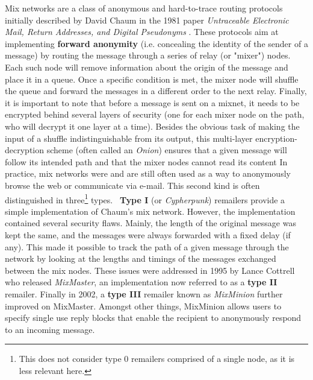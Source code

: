 \documentclass[11pt, a4paper]{article}
\begin{document}
        Mix networks are a class of anonymous and hard-to-trace routing protocols initially described by David Chaum in the 1981 paper \textit{Untraceable Electronic Mail, Return Addresses, and Digital Pseudonyms} \cite{chaum84}.
        These protocols aim at implementing \textbf{forward anonymity} (i.e. concealing the identity of the sender of a message) by routing the message through a series of relay (or "mixer") nodes.
        Each such node will remove information about the origin of the message and place it in a queue.
        Once a specific condition is met, the mixer node will shuffle the queue and forward the messages in a different order to the next relay.
        Finally, it is important to note that before a message is sent on a mixnet, it needs to be encrypted behind several layers of security (one for each mixer node on the path, who will decrypt it one layer at a time).
        Besides the obvious task of making the input of a shuffle indistinguishable from its output, this multi-layer encryption-decryption scheme (often called an \textit{Onion}) ensures that a given message will follow its intended path and that the mixer nodes cannot read its content
        \bigbreak
        In practice, mix networks were and are still often used as a way to anonymously browse the web or communicate via e-mail.
        This second kind is often distinguished in three\footnote{This does not consider type 0 remailers comprised of a single node, as it is less relevant here.} types. \
        \textbf{Type I} (or \textit{Cypherpunk}) remailers provide a simple implementation of Chaum's mix network.
        However, the implementation contained several security flaws.
        Mainly, the length of the original message was kept the same, and the messages were always forwarded with a fixed delay (if any).
        This made it possible to track the path of a given message through the network by looking at the lengths and timings of the messages exchanged between the mix nodes.
        These issues were addressed in 1995 by Lance Cottrell who released \textit{MixMaster}, an implementation now referred to as a \textbf{type II} remailer.
        Finally in 2002, a \textbf{type III} remailer known as \textit{MixMinion} \cite{mixminion} further improved on MixMaster.
        Amongst other things, MixMinion allows users to specify single use reply blocks that enable the recipient to anonymously respond to an incoming message.
\end{document}
